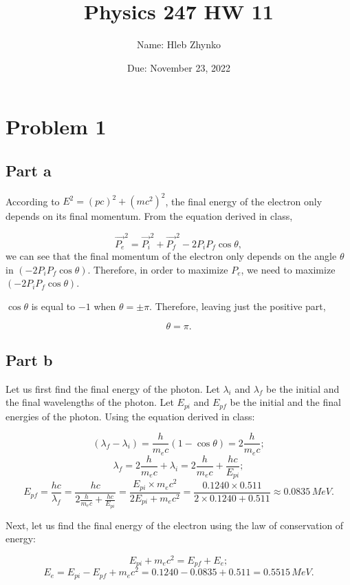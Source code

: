 \documentclass{article}
\title{Physics 247 HW 11}
\author{Name: Hleb Zhynko}
\date{Due: November 23, 2022}
\begin{document}
\maketitle

\section*{Problem 1}
\subsection*{Part a}
According to $E^2 = (pc)^2 + (mc^2)^2$, the final energy of the electron only depends on its final momentum. From the equation derived in class,

\[
\vec{P_e}^2 = \vec{P_i}^2 + \vec{P_f}^2 - 2P_iP_f\cos{\theta},
\]
we can see that the final momentum of the electron only depends on the angle $\theta$ in $(-2P_iP_f\cos{\theta})$. Therefore, in order to maximize $P_e$, we need to maximize $(-2P_iP_f\cos{\theta})$.

$\cos{\theta}$ is equal to $-1$ when $\theta = \pm \pi$. Therefore, leaving just the positive part,

\[
\theta = \pi.
\]

\subsection*{Part b}
Let us first find the final energy of the photon. Let $\lambda_i$ and $\lambda_f$ be the initial and the final wavelengths of the photon. Let $E_{pi}$ and $E_{pf}$ be the initial and the final energies of the photon.
Using the equation derived in class:

\[
(\lambda_f - \lambda_i) = \frac{h}{m_ec}(1-\cos{\theta}) = 2 \frac{h}{m_ec};
\]
\[
\lambda_f = 2 \frac{h}{m_ec} + \lambda_i = 2 \frac{h}{m_ec} + \frac{hc}{E_{pi}};
\]
\[
E_{pf} = \frac{hc}{\lambda_f} = \frac{hc}{2 \frac{h}{m_ec} + \frac{hc}{E_{pi}}} = \frac{E_{pi} \times m_ec^2}{2E_{pi} + m_ec^2} = \frac{0.1240 \times 0.511}{2 \times 0.1240 + 0.511} \approx 0.0835\,MeV.
\]

Next, let us find the final energy of the electron using the law of conservation of energy:

\[
E_{pi} + m_ec^2 = E_{pf} + E_e;
\]
\[
E_e = E_{pi} - E_{pf} + m_ec^2 = 0.1240 - 0.0835 + 0.511 = 0.5515\,MeV.
\]
\end{document}
